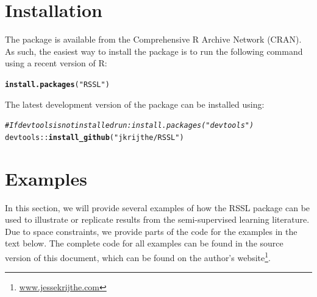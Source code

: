 \documentclass[runningheads,a4paper]{llncs}\usepackage[]{graphicx}\usepackage[]{color}
\makeatletter
\newcommand{\hlstr}[1]{\textcolor[rgb]{0.192,0.494,0.8}{#1}}%
\newcommand{\hlcom}[1]{\textcolor[rgb]{0.678,0.584,0.686}{\textit{#1}}}%
\newcommand{\hlopt}[1]{\textcolor[rgb]{0,0,0}{#1}}%
\newcommand{\hlstd}[1]{\textcolor[rgb]{0.345,0.345,0.345}{#1}}%
\newcommand{\hlkwd}[1]{\textcolor[rgb]{0.737,0.353,0.396}{\textbf{#1}}}%
\newenvironment{kframe}{%
 \def\at@end@of@kframe{}%
 \ifinner\ifhmode%
  \def\at@end@of@kframe{\end{minipage}}%
  \begin{minipage}{\columnwidth}%
 \fi\fi%
 \def\FrameCommand##1{\hskip\@totalleftmargin \hskip-\fboxsep
 \colorbox{shadecolor}{##1}\hskip-\fboxsep
     \hskip-\linewidth \hskip-\@totalleftmargin \hskip\columnwidth}%
 \MakeFramed {\advance\hsize-\width
   \@totalleftmargin\z@ \linewidth\hsize
   \@setminipage}}%
 {\par\unskip\endMakeFramed%
 \at@end@of@kframe}
\newenvironment{knitrout}{}{} %
\makeatother
\begin{document}
\section{Installation}
The package is available from the Comprehensive R Archive Network (CRAN). As such, the easiest way to install the package is to run the following command using a recent version of R:
\begin{knitrout}
\color{fgcolor}\begin{kframe}
\begin{alltt}
\hlkwd{install.packages}\hlstd{(}\hlstr{"RSSL"}\hlstd{)}
\end{alltt}
\end{kframe}
\end{knitrout}
\noindent The latest development version of the package can be installed using:
\begin{knitrout}
\color{fgcolor}\begin{kframe}
\begin{alltt}
\hlcom{# If devtools is not installed run: install.packages("devtools")}
\hlstd{devtools}\hlopt{::}\hlkwd{install_github}\hlstd{(}\hlstr{"jkrijthe/RSSL"}\hlstd{)}
\end{alltt}
\end{kframe}
\end{knitrout}

\section{Examples}
In this section, we will provide several examples of how the RSSL package can be used to illustrate or replicate results from the semi-supervised learning literature. Due to space constraints, we provide parts of the code for the examples in the text below. The complete code for all examples can be found in the source version of this document, which can be found on the author's website\footnote{\url{www.jessekrijthe.com}}.
\end{document}
